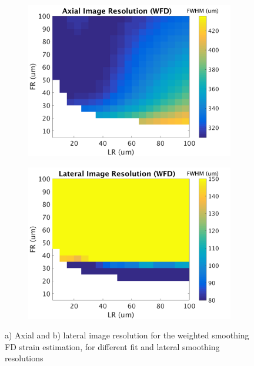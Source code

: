\begin{figure}[h!]
	\centering
	\begin{subfigure}{0.49\textwidth}
		\centering
		\includegraphics[width=\textwidth]{appendix_figs/wfd_axial_imageres.png}
	\end{subfigure}
	\begin{subfigure}{0.49\textwidth}
		\centering
		\includegraphics[width=\textwidth]{appendix_figs/wfd_lateral_imageres.png}
	\end{subfigure}
	\caption{a) Axial and b) lateral image resolution for the weighted smoothing FD strain estimation, for different fit and lateral smoothing resolutions}
	\label{wfd_imageres}
\end{figure}


